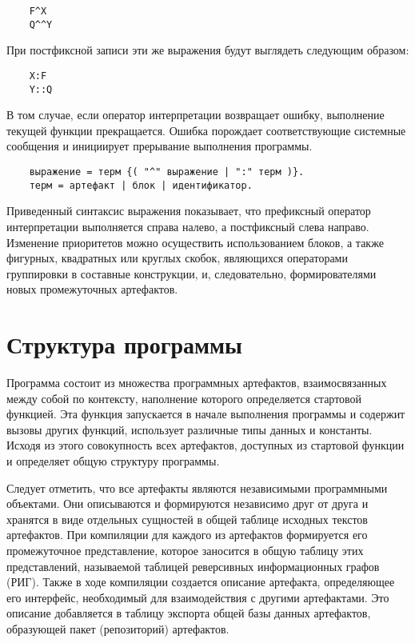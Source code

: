 {\begin{verbatim}
    F^X
    Q^^Y
\end{verbatim}

При постфиксной записи эти же выражения будут выглядеть следующим образом:

\begin{verbatim}
    X:F
    Y::Q
\end{verbatim}

В том случае, если оператор интерпретации возвращает ошибку, выполнение текущей функции прекращается. Ошибка порождает соответствующие системные сообщения и инициирует прерывание выполнения программы.

\begin{verbatim}
    выражение = терм {( "^" выражение | ":" терм )}.
    терм = артефакт | блок | идентификатор.
\end{verbatim}

Приведенный синтаксис выражения показывает, что префиксный оператор интерпретации выполняется справа налево, а постфиксный слева направо. Изменение приоритетов можно осуществить использованием блоков, а также фигурных, квадратных или круглых скобок, являющихся операторами группировки в составные конструкции, и, следовательно, формирователями новых промежуточных артефактов.

\section{Структура программы}

Программа состоит из множества программных артефактов, взаимосвязанных между собой по контексту, наполнение которого определяется стартовой функцией. Эта функция запускается в начале выполнения программы и содержит вызовы других функций, использует различные типы данных и константы. Исходя из этого совокупность всех артефактов, доступных из стартовой функции и определяет общую структуру программы.

Следует отметить, что все артефакты являются независимыми программными объектами. Они описываются и формируются независимо друг от друга и хранятся в виде отдельных сущностей в общей таблице исходных текстов артефактов. При компиляции для каждого из артефактов формируется его промежуточное представление, которое заносится в общую таблицу этих представлений, называемой таблицей реверсивных информационных графов (РИГ). Также в ходе компиляции создается описание артефакта, определяющее его интерфейс, необходимый для взаимодействия с другими артефактами. Это описание добавляется в таблицу экспорта общей базы данных артефактов, образующей пакет (репозиторий) артефактов.

}
